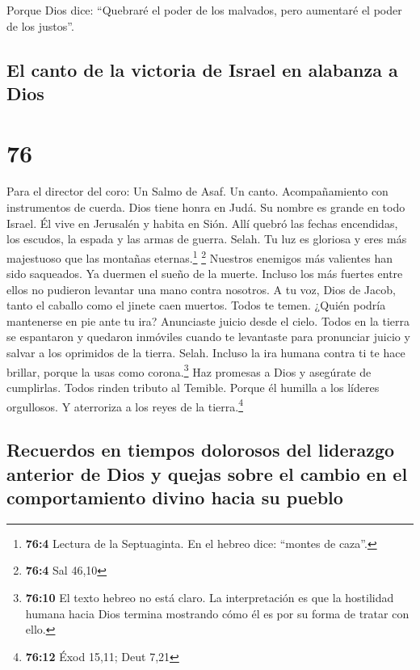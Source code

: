  Porque Dios dice: ``Quebraré el poder de los malvados,
pero aumentaré el poder de los justos''.

\hypertarget{el-canto-de-la-victoria-de-israel-en-alabanza-a-dios}{%
\subsection{El canto de la victoria de Israel en alabanza a
Dios}\label{el-canto-de-la-victoria-de-israel-en-alabanza-a-dios}}

\hypertarget{section-75}{%
\section{76}\label{section-75}}

Para el director del coro: Un Salmo de Asaf. Un canto. Acompañamiento
con instrumentos de cuerda.  Dios tiene honra en Judá. Su
nombre es grande en todo Israel.  Él vive en Jerusalén y
habita en Sión.  Allí quebró las fechas encendidas, los
escudos, la espada y las armas de guerra. Selah.  Tu luz
es gloriosa y eres más majestuoso que las montañas eternas.\footnote{\textbf{76:4}
  Lectura de la Septuaginta. En el hebreo dice: ``montes de caza''.}
\footnote{\textbf{76:4} Sal 46,10}  Nuestros enemigos más
valientes han sido saqueados. Ya duermen el sueño de la muerte. Incluso
los más fuertes entre ellos no pudieron levantar una mano contra
nosotros.  A tu voz, Dios de Jacob, tanto el caballo como
el jinete caen muertos.  Todos te temen. ¿Quién podría
mantenerse en pie ante tu ira?  Anunciaste juicio desde el
cielo. Todos en la tierra se espantaron y quedaron inmóviles
 cuando te levantaste para pronunciar juicio y salvar a
los oprimidos de la tierra. Selah.  Incluso la ira humana
contra ti te hace brillar, porque la usas como corona.\footnote{\textbf{76:10}
  El texto hebreo no está claro. La interpretación es que la hostilidad
  humana hacia Dios termina mostrando cómo él es por su forma de tratar
  con ello.}  Haz promesas a Dios y asegúrate de
cumplirlas. Todos rinden tributo al Temible.  Porque él
humilla a los líderes orgullosos. Y aterroriza a los reyes de la
tierra.\footnote{\textbf{76:12} Éxod 15,11; Deut 7,21}

\hypertarget{recuerdos-en-tiempos-dolorosos-del-liderazgo-anterior-de-dios-y-quejas-sobre-el-cambio-en-el-comportamiento-divino-hacia-su-pueblo}{%
\subsection{Recuerdos en tiempos dolorosos del liderazgo anterior de
Dios y quejas sobre el cambio en el comportamiento divino hacia su
pueblo}\label{recuerdos-en-tiempos-dolorosos-del-liderazgo-anterior-de-dios-y-quejas-sobre-el-cambio-en-el-comportamiento-divino-hacia-su-pueblo}}


